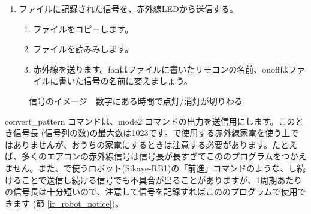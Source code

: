 \documentclass[text05.tex]{subfiles}
\begin{document}
\begin{enumerate}
\begin{enumerate}[1]
\begin{enumerate}[(1)]
    \item “ここに信号をペーストする”と書いてある行を消します。onoff.patternに書かれた信号をコピーしてり付けます。mousepadを使ってonoff.patternをしましょう。\\ 
\\onoff.patternに書かれた信号は、たとえば「1207 588 447 838 447 823 475 812 1218」のような文字列です。\\書きえたら、しましょう (名前が05.lircd.confになっていることをしましょう)。
  \end{enumerate}
 \end{enumerate}
\item ファイルに記録された信号を、赤外線LEDから送信する。
 \begin{enumerate}[1]
  \item {}ファイルをコピーします。 \\ 
  \item {}ファイルを読みみします。\\ 
  \item 赤外線を送ります。fanはファイルに書いたリモコンの名前、onoffはファイルに書いた信号の名前に変えましょう。\\ 
 \end{enumerate}
\end{enumerate}

\begin{figure}[H]
    \centering
 
    \caption{信号のイメージ　数字にある時間で点灯/消灯が切りわる}
\end{figure}

convert\_pattern コマンドは、mode2 コマンドの出力を送信用にします。このとき信号長 (信号列の数)の最大数は1023です。で使用する赤外線家電を使う上ではありませんが、おうちの家電にするときは注意する必要があります。たとえば、多くのエアコンの赤外線信号は信号長が長すぎてこののプログラムをつかえません。また、で使うロボット(Sikaye-RB1)の「前進」コマンドのような、し続けることで送信し続ける信号でも不具合が出ることがありますが、1周期あたりの信号長は十分短いので、注意して信号を記録すればこののプログラムで使用できます (節 \ref{ir_robot_notice})。\\

\begin{tcolorbox}[title=\useOmetoi]
    \begin{enumerate}
    \end{enumerate}
    \end{tcolorbox}
\end{document}
